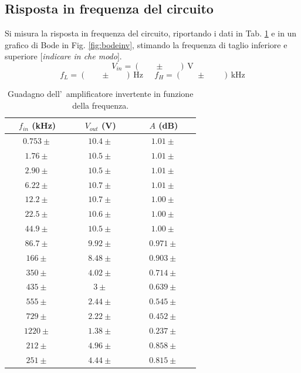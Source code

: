 \documentclass[10pt,a4paper]{article}
\newcommand{\rem}[1]{[\emph{#1}]}
\newcommand{\exn}{\phantom{xxx}}
\begin{document}
	\subsection{Risposta in frequenza del circuito}
	Si misura la risposta in frequenza del circuito, riportando i dati  in Tab. \ref{tab:bodeinv} e
	in un grafico di Bode in Fig. \ref{fig:bodeinv}, stimando la frequenza di taglio inferiore e 
	superiore \rem{indicare in che modo}.
	\[
	V_{in} = (\exn \pm \exn )\,\mathrm{V}
	\]
	\[
	f_L = (\exn \pm \exn )\,\mathrm{Hz}\;\;\;\;\;f_H = (\exn \pm \exn \;)\,\mathrm{kHz}
	\]
	\begin{table}[h]
		\caption{\small Guadagno dell'~amplificatore invertente in funzione della frequenza.}
		\label{tab:bodeinv}
		\begin{center}
			\begin{tabular}{|c|c|c|}	\hline
				$f_{in}$ (kHz) & $V_{out}$ (V) & $A$ (dB) \\
				\hline
				$\exn0.753 \pm \exn $ & $\exn10.4 \pm \exn $ & $\exn 1.01\pm \exn $\\
				\hline
				$\exn 1.76\pm \exn $ & $\exn 10.5\pm \exn $ & $\exn 1.01\pm \exn $\\
				\hline
				$\exn 2.90\pm \exn $ & $\exn 10.5\pm \exn $ & $\exn 1.01\pm \exn $\\
				\hline
				$\exn 6.22\pm \exn $ & $\exn 10.7\pm \exn $ & $\exn 1.01\pm \exn $\\
				\hline
				$\exn 12.2\pm \exn $ & $\exn 10.7\pm \exn $ & $\exn 1.00\pm \exn $\\
				\hline
				$\exn22.5 \pm \exn $ & $\exn 10.6\pm \exn $ & $\exn1.00\pm \exn $\\
				\hline
				$\exn44.9 \pm \exn $ & $\exn10.5 \pm \exn $ & $\exn 1.00\pm \exn $\\
				\hline
				$\exn 86.7\pm \exn $ & $\exn9.92 \pm \exn $ & $\exn 0.971 \pm \exn $\\
				\hline
				$\exn 166\pm \exn $ & $\exn8.48 \pm \exn $ & $\exn 0.903 \pm \exn $\\
				\hline
				$\exn 350\pm \exn $ & $\exn 4.02\pm \exn $ & $\exn0.714\pm \exn $\\
				\hline
				$\exn 435\pm \exn $ & $\exn 3\pm \exn $ & $\exn 0.639\pm \exn $\\
				\hline
				$\exn555 \pm \exn $ & $\exn2.44 \pm \exn $ & $\exn 0.545 \pm \exn $\\
				\hline
				$\exn 729\pm \exn $ & $\exn 2.22\pm \exn $ & $\exn 0.452 \pm \exn $\\
				\hline
				$\exn 1220\pm \exn $ & $\exn 1.38\pm \exn $ & $\exn 0.237\pm \exn $\\
				\hline
				$\exn212\pm \exn $ & $\exn4.96 \pm \exn $ & $\exn 0.858 \pm \exn $\\
				\hline
				$\exn251 \pm \exn $ & $\exn4.44 \pm \exn $ & $\exn 0.815\pm \exn $\\

				\hline
			\end{tabular}
		\end{center}
	\end{table} 
	
\end{document}
